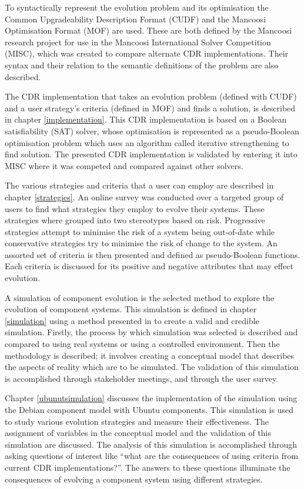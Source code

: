 To syntactically represent the evolution problem and its optimisation the Common Upgradeability Description Format (CUDF) \citep{treinen2009common} and the Mancoosi Optimisation Format (MOF) are used.
These are both defined by the Mancoosi research project for use in the Mancoosi International Solver Competition (MISC), 
which was created to compare alternate CDR implementations.
Their syntax and their relation to the semantic definitions of the problem are also described.

The CDR implementation that takes an evolution problem (defined with CUDF) and a user strategy's criteria (defined in MOF) and finds a solution, is described in chapter \ref{implementation}.
This CDR implementation is based on a Boolean satisfiability (SAT) solver, 
whose optimisation is represented as a pseudo-Boolean optimisation problem which uses an algorithm called iterative strengthening to find solution.
The presented CDR implementation is validated by entering it into MISC where it was competed and compared against other solvers.

The various strategies and criteria that a user can employ are described in chapter \ref{strategies}.
An online survey was conducted over a targeted group of users to find what strategies they employ to evolve their systems.
These strategies where grouped into two stereotypes based on risk.
Progressive strategies attempt to minimise the risk of a system being out-of-date while conservative strategies try to minimise the risk of change to the system.
An assorted set of criteria is then presented and defined as pseudo-Boolean functions.
Each criteria is discussed for its positive and negative attributes that may effect evolution.

A simulation of component evolution is the selected method to explore the evolution of component systems.
This simulation is defined in chapter \ref{simulation} using a method presented in \citep{Law2005} to create a valid and credible simulation.
Firstly, the process by which simulation was selected is described and compared to using real systems or using a controlled environment.
Then the methodology is described; it involves creating a conceptual model that describes the aspects of reality which are to be simulated.
The validation of this simulation is accomplished through stakeholder meetings, and through the user survey.

Chapter \ref{ubunutsimulation} discusses the implementation of the simulation using the Debian component model \citep{Barth2005} with Ubuntu \citep{Hill2006} components. 
This simulation is used to study various evolution strategies and measure their effectiveness.
The assignment of variables in the conceptual model and the validation of this simulation are discussed.
The analysis of this simulation is accomplished through asking questions of interest like ``what are the consequences of using criteria from current CDR implementations?''.
The answers to these questions illuminate the consequences of evolving a component system using different strategies.

